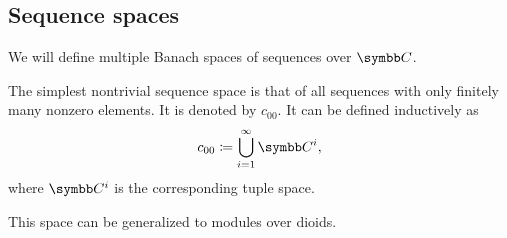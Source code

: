 \subsection{Sequence spaces}\label{subsec:sequence_spaces}

\begin{definition}\label{def:sequence_spaces}
  We will define multiple Banach spaces of sequences over \( \C \).

  \begin{defenum}
     The simplest nontrivial sequence space is that of all sequences with only finitely many nonzero elements. It is denoted by \( c_{00} \). It can be defined inductively as
    \begin{equation*}
      c_{00} \coloneqq \bigcup_{i=1}^\infty \C^i,
    \end{equation*}
    where \( \C^i \) is the corresponding tuple space.

    This space can be generalized to modules over dioids.
  \end{defenum}
\end{definition}
